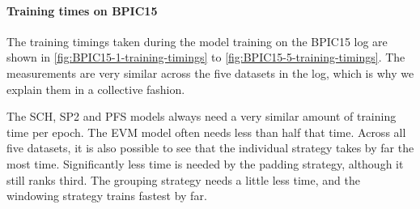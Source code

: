 \paragraph{Training times on BPIC15}
The training timings taken during the model training on the BPIC15 log are shown in \autoref{fig:BPIC15-1-training-timings} to \autoref{fig:BPIC15-5-training-timings}.
The measurements are very similar across the five datasets in the log, which is why we explain them in a collective fashion.

The SCH, SP2 and PFS models always need a very similar amount of training time per epoch.
The EVM model often needs less than half that time.
Across all five datasets, it is also possible to see that the individual strategy takes by far the most time.
Significantly less time is needed by the padding strategy, although it still ranks third.
The grouping strategy needs a little less time, and the windowing strategy trains fastest by far.

